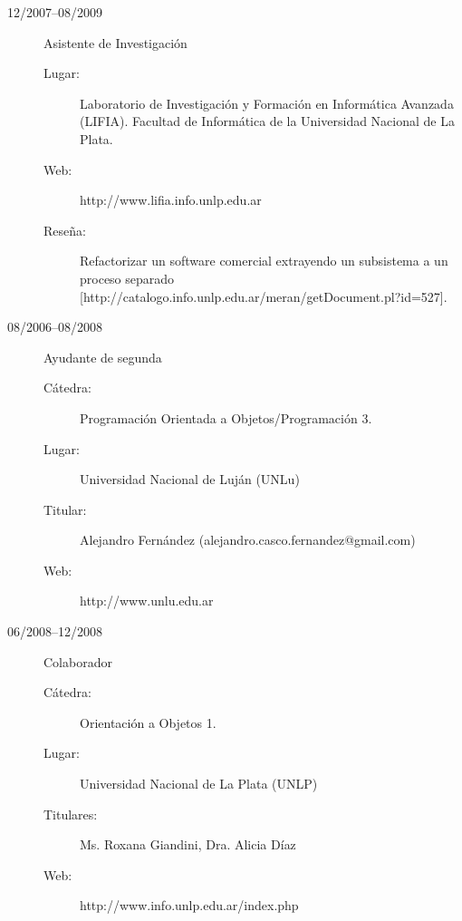 \documentclass[a4paper]{article}
\begin{document}
\begin{description}
\begin{description}
	\end{description}
\item[12/2007--08/2009] Asistente de Investigaci{\'o}n
	\begin{description}
	\item[Lugar: ] Laboratorio de Investigaci{\'o}n y Formaci{\'o}n en Inform{\'a}tica Avanzada (LIFIA). Facultad de Inform{\'a}tica de la Universidad Nacional de La Plata.
	\item[Web: ] http://www.lifia.info.unlp.edu.ar
	\item[Rese\~na: ] Refactorizar un software comercial extrayendo un subsistema a un proceso separado [http://catalogo.info.unlp.edu.ar/meran/getDocument.pl?id=527].
	\end{description}
\item[08/2006--08/2008] Ayudante de segunda
	\begin{description}
	\item[C{\'a}tedra: ] Programaci{\'o}n Orientada a Objetos/Programaci{\'o}n 3.
	\item[Lugar: ] Universidad Nacional de Luj{\'a}n (UNLu)
	\item[Titular: ] Alejandro Fern{\'a}ndez (alejandro.casco.fernandez@gmail.com)
    \item[Web: ] http://www.unlu.edu.ar
	\end{description}
\item[06/2008--12/2008] Colaborador
	\begin{description}
	\item[C{\'a}tedra: ] Orientaci{\'o}n a Objetos 1.
	\item[Lugar: ] Universidad Nacional de La Plata (UNLP)
	\item[Titulares: ] Ms. Roxana Giandini, Dra. Alicia D{\'i}az
    \item[Web: ] http://www.info.unlp.edu.ar/index.php
	\end{description}
\end{description}
\end{document}
